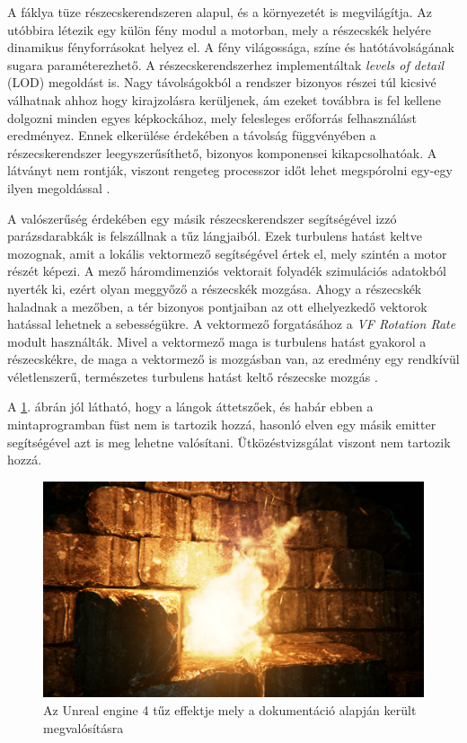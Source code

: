 A fáklya tüze részecskerendszeren alapul, és a környezetét is megvilágítja. Az utóbbira létezik egy külön fény modul a motorban, mely a részecskék helyére dinamikus fényforrásokat helyez el. A fény világossága, színe és hatótávolságának sugara paraméterezhető. A részecskerendszerhez implementáltak \textit{levels of detail} (LOD) megoldást is. Nagy távolságokból a rendszer bizonyos részei túl kicsivé válhatnak ahhoz hogy kirajzolásra kerüljenek, ám ezeket továbbra is fel kellene dolgozni minden egyes képkockához, mely felesleges erőforrás felhasználást eredményez. Ennek elkerülése érdekében a távolság függvényében a részecskerendszer leegyszerűsíthető, bizonyos komponensei kikapcsolhatóak. A látványt nem rontják, viszont rengeteg processzor időt lehet megspórolni egy-egy ilyen megoldással \cite{UEngineFireExample}.

A valószerűség érdekében egy másik részecskerendszer segítségével izzó parázsdarabkák is felszállnak a tűz lángjaiból. Ezek turbulens hatást keltve mozognak, amit a lokális vektormező segítségével értek el, mely szintén a motor részét képezi. A mező háromdimenziós vektorait folyadék szimulációs adatokból nyerték ki, ezért olyan meggyőző a részecskék mozgása. Ahogy a részecskék haladnak a mezőben, a tér bizonyos pontjaiban az ott elhelyezkedő vektorok hatással lehetnek a sebességükre. A vektormező forgatásához a \textit{VF Rotation Rate} modult használták. Mivel a vektormező maga is turbulens hatást gyakorol a részecskékre, de maga a vektormező is mozgásban van, az eredmény egy rendkívül véletlenszerű, természetes turbulens hatást keltő részecske mozgás \cite{UEngineFireExample}.

A \ref{fig:UE4fire}. ábrán jól látható, hogy a lángok áttetszőek, és habár ebben a mintaprogramban füst nem is tartozik hozzá, hasonló elven egy másik emitter segítségével azt is meg lehetne valósítani. Ütközéstvizsgálat viszont nem tartozik hozzá.

\begin{figure}[h]
\centering
\includegraphics[width=\textwidth]{kepek/UE4flame.png}
\caption{Az Unreal engine 4 tűz effektje mely a dokumentáció alapján került megvalósításra \cite{UEngineFireExample}}
\label{fig:UE4fire}
\end{figure}

